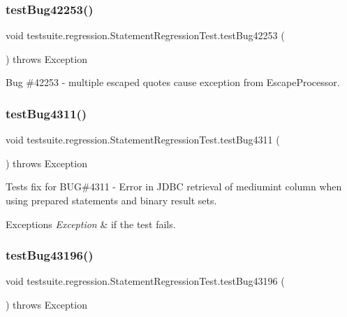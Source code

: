 \subsubsection{\texorpdfstring{test\+Bug42253()}{testBug42253()}}
{\footnotesize\ttfamily void testsuite.\+regression.\+Statement\+Regression\+Test.\+test\+Bug42253 (\begin{DoxyParamCaption}{ }\end{DoxyParamCaption}) throws Exception}

Bug \#42253 -\/ multiple escaped quotes cause exception from Escape\+Processor. \mbox{\label{classtestsuite_1_1regression_1_1_statement_regression_test_af83dee9bd9b4ca7c1ab3fefcfbe705b3}} 
\subsubsection{\texorpdfstring{test\+Bug4311()}{testBug4311()}}
{\footnotesize\ttfamily void testsuite.\+regression.\+Statement\+Regression\+Test.\+test\+Bug4311 (\begin{DoxyParamCaption}{ }\end{DoxyParamCaption}) throws Exception}

Tests fix for B\+UG\#4311 -\/ Error in J\+D\+BC retrieval of mediumint column when using prepared statements and binary result sets.


\begin{DoxyExceptions}{Exceptions}
{\em Exception} & if the test fails. \\
\hline
\end{DoxyExceptions}
\mbox{\label{classtestsuite_1_1regression_1_1_statement_regression_test_a2006a6439a57cec96a89290938a550aa}} 
\subsubsection{\texorpdfstring{test\+Bug43196()}{testBug43196()}}
{\footnotesize\ttfamily void testsuite.\+regression.\+Statement\+Regression\+Test.\+test\+Bug43196 (\begin{DoxyParamCaption}{ }\end{DoxyParamCaption}) throws Exception}

